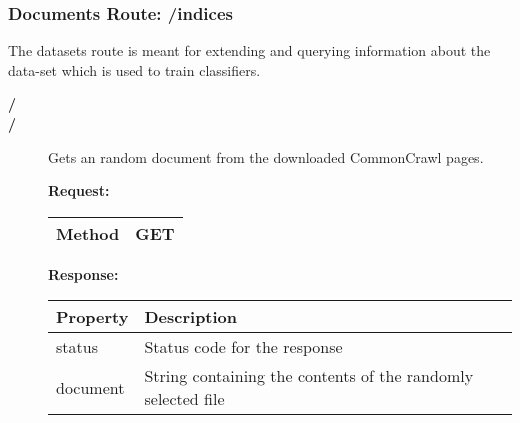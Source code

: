 \subsubsection{Documents Route: /indices}
The datasets route is meant for extending and querying information about the data-set which is used to train classifiers. 

\begin{description}


\item [\textbf{/}]
\item [\textbf{/}]
Gets an random document from the downloaded CommonCrawl pages.

\newline
\newline
\textbf{Request:}
\newline
\newline
\begin{tabular}{ | l | l |}
\hline
Method & GET\\ \hline
\end{tabular}
\newline
\newline
\textbf{Response:}
\newline
\newline
\resizebox{\textwidth}{!} {
\begin{tabular}{ | l | l |}
\hline
\textbf{Property} & \textbf{Description}\\ \hline
status & Status code for the response\\ \hline
document & String containing the contents of the randomly selected file\\ \hline
\end{tabular}}

\end{description}
